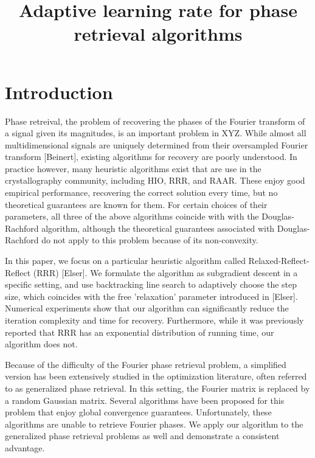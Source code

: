 \documentclass[12pt]{article}
\title{Adaptive learning rate for phase retrieval algorithms}
\theoremstyle{definition}
\theoremstyle{remark}
\theoremstyle{definition}
\theoremstyle{problem}
\theoremstyle{definition}
\begin{document}
\maketitle

\section{Introduction}
Phase retreival, the problem of recovering the phases of the Fourier transform of a signal given its magnitudes, is an important problem in XYZ. While almost all multidimensional signals are uniquely determined from their oversampled Fourier transform [Beinert], existing algorithms for recovery are poorly understood. In practice however, many heuristic algorithms exist that are use in the crystallography community, including HIO, RRR, and RAAR. These enjoy good empirical performance, recovering the correct solution every time, but no theoretical guarantees are known for them. For certain choices of their parameters, all three of the above algorithms coincide with with the Douglas-Rachford algorithm, although the theoretical guarantees associated with Douglas-Rachford do not apply to this problem because of its non-convexity. 

In this paper, we focus on a particular heuristic algorithm called Relaxed-Reflect-Reflect (RRR) [Elser]. We formulate the algorithm as subgradient descent in a specific setting, and use backtracking line search to adaptively choose the step size, which coincides with the free 'relaxation' parameter introduced in [Elser]. Numerical experiments show that our algorithm can significantly reduce the iteration complexity and time for recovery. Furthermore, while it was previously reported that RRR has an exponential distribution of running time, our algorithm does not.

Because of the difficulty of the Fourier phase retrieval problem, a simplified version has been extensively studied in the optimization literature, often referred to as generalized phase retrieval. In this setting, the Fourier matrix is replaced by a random Gaussian matrix. Several algorithms have been proposed for this problem that enjoy global convergence guarantees. Unfortunately, these algorithms are unable to retrieve Fourier phases. We apply our algorithm to the generalized phase retrieval problems as well and demonstrate a consistent advantage.
\end{document}
